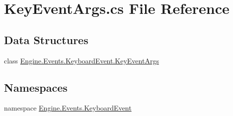 \hypertarget{a00053}{}\section{Key\+Event\+Args.\+cs File Reference}
\label{a00053}
\subsection*{Data Structures}
\begin{DoxyCompactItemize}
\item 
class \hyperlink{a00362}{Engine.\+Events.\+Keyboard\+Event.\+Key\+Event\+Args}
\end{DoxyCompactItemize}
\subsection*{Namespaces}
\begin{DoxyCompactItemize}
\item 
namespace \hyperlink{a00247}{Engine.\+Events.\+Keyboard\+Event}
\end{DoxyCompactItemize}
